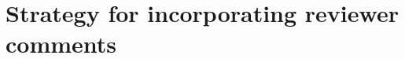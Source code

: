\documentclass[10pt,letterpaper]{article}
\begin{document}




\setlength{\bibleftmargin}{.125in}
\setlength{\bibindent}{-\bibleftmargin}




\appendix

\section{Strategy for incorporating reviewer comments}
\end{document}
